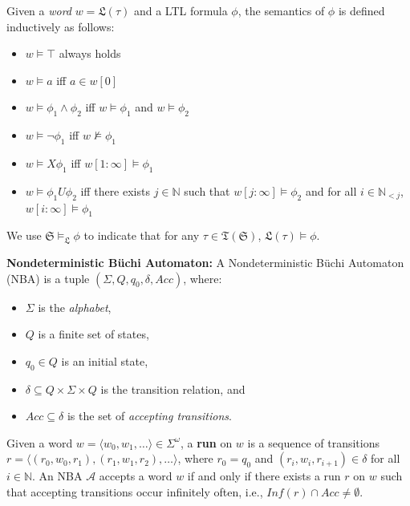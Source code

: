 Given a \emph{word} $w = \mathfrak{L}(\tau)$ and a LTL formula $\phi$, the semantics of $\phi$ is defined inductively as follows:
\begin{itemize}
    \item \(w \models \top \) always holds
    \item \(w \models a\)  iff  \(a \in w[0]\)
    \item \(w \models \phi_1 \land \phi_2\)  iff  \(w \models \phi_1\) and \(w \models \phi_2\)
    \item \(w \models \lnot \phi_1\)  iff  \(w \not\models \phi_1\)
    \item \(w \models X \phi_1\)  iff  \(w[1:\infty] \models \phi_1\)
    \item \(w \models \phi_1 U \phi_2\)  iff  there exists \(j \in \mathbb{N}\) such that \(w[j:\infty] \models \phi_2\) and for all \(i \in \mathbb{N}_{<j}\), \(w[i:\infty] \models \phi_1\)
\end{itemize}

We use $\mathfrak{S} \models_{\mathfrak{L}} \phi$ to indicate that for any $\tau \in \mathfrak{T}(\mathfrak{S})$, $\mathfrak{L}(\tau) \models \phi$.

\textbf{Nondeterministic Büchi Automaton:} A Nondeterministic Büchi Automaton (NBA) is a tuple $(\Sigma, Q, q_0, \delta, Acc)$, where:
\begin{itemize}
  \item $\Sigma$ is the \emph{alphabet},
  \item $Q$ is a finite set of states,
  \item $q_0 \in Q$ is an initial state,
  \item $\delta \subseteq Q \times \Sigma \times Q$ is the transition relation, and
  \item $Acc \subseteq \delta$ is the set of \emph{accepting transitions}.
\end{itemize}
Given a word $w = \langle w_0, w_1, \ldots \rangle \in \Sigma^{\omega}$, a \textbf{run} on $w$ is a sequence of transitions $r = \langle (r_0, w_0, r_1), (r_1, w_1, r_2), \ldots \rangle$, where $r_0 = q_0$ and $(r_i, w_i, r_{i+1}) \in \delta$ for all $i \in \mathbb{N}$. An NBA $\mathcal{A}$ accepts a word $w$ if and only if there exists a run $r$ on $w$ such that accepting transitions occur infinitely often, i.e., $\mathit{Inf}(r) \cap Acc \neq \emptyset$.

